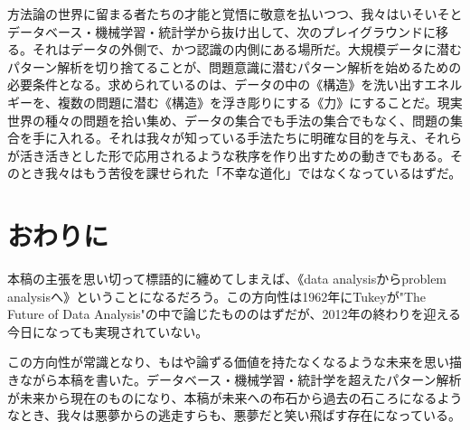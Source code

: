 方法論の世界に留まる者たちの才能と覚悟に敬意を払いつつ、我々はいそいそとデータベース・機械学習・統計学から抜け出して、次のプレイグラウンドに移る。それはデータの外側で、かつ認識の内側にある場所だ。大規模データに潜むパターン解析を切り捨てることが、問題意識に潜むパターン解析を始めるための必要条件となる。求められているのは、データの中の《構造》を洗い出すエネルギーを、複数の問題に潜む《構造》を浮き彫りにする《力》にすることだ。現実世界の種々の問題を拾い集め、データの集合でも手法の集合でもなく、問題の集合を手に入れる。それは我々が知っている手法たちに明確な目的を与え、それらが活き活きとした形で応用されるような秩序を作り出すための動きでもある。そのとき我々はもう苦役を課せられた「不幸な道化」ではなくなっているはずだ。

\section{おわりに}
本稿の主張を思い切って標語的に纏めてしまえば、《data analysisからproblem analysisへ》ということになるだろう。この方向性は1962年にTukeyが"The Future of Data Analysis"の中で論じたもののはずだが、2012年の終わりを迎える今日になっても実現されていない。

この方向性が常識となり、もはや論ずる価値を持たなくなるような未来を思い描きながら本稿を書いた。データベース・機械学習・統計学を超えたパターン解析が未来から現在のものになり、本稿が未来への布石から過去の石ころになるようなとき、我々は悪夢からの逃走すらも、悪夢だと笑い飛ばす存在になっている。

